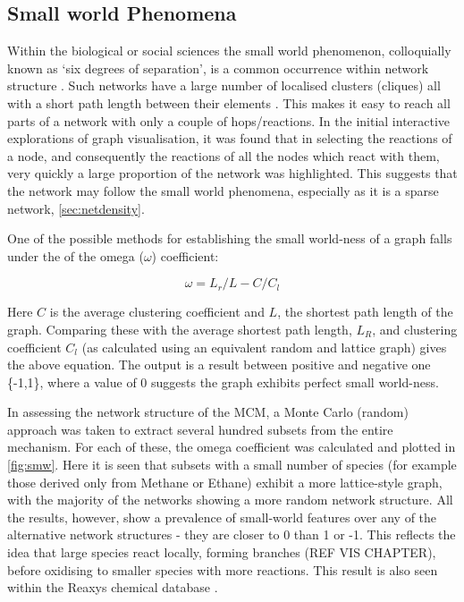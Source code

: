 \subsection{Small world Phenomena}
Within the biological or social sciences the small world phenomenon, colloquially known as `six degrees of separation', is a common occurrence within network structure \citep{smallworld}. Such networks have a large number of localised clusters (cliques) all with a short path length between their elements \citep{sm2}. This makes it easy to reach all parts of a network with only a couple of hops/reactions. In the initial interactive explorations of graph visualisation, it was found that in selecting the reactions of a node, and consequently the reactions of all the nodes which react with them, very quickly a large proportion of the network was highlighted. This suggests that the network may follow the small world phenomena, especially as it is a sparse network, \autoref{sec:netdensity}.

One of the possible methods for establishing the small world-ness of a graph falls under the of the omega ($\omega$) coefficient:

\begin{equation}
\omega = L_r/L - C/C_l
\end{equation}

Here $C$ is the average clustering coefficient and $L$, the shortest path length of the graph. Comparing these with the average shortest path length, $L_R$, and clustering coefficient $C_l$ (as calculated using an equivalent random and lattice graph) gives the above equation. The output is a result between positive and negative one \{-1,1\}, where a value of 0 suggests the graph exhibits perfect small world-ness.

In assessing the network structure of the MCM, a Monte Carlo (random) approach was taken to extract several hundred subsets from the entire mechanism. For each of these, the omega coefficient was calculated and plotted in \autoref{fig:smw}. Here it is seen that subsets with a small number of species (for example those derived only from Methane or Ethane) exhibit a more lattice-style graph, with the majority of the networks showing a more random network structure. All the results, however, show a prevalence of small-world features over any of the alternative network structures - they are closer to 0 than 1 or -1. This reflects the idea that large species react locally, forming branches (REF VIS CHAPTER), before oxidising to smaller species with more reactions. This result is also seen within the Reaxys chemical database \citep{rscgraph}.



